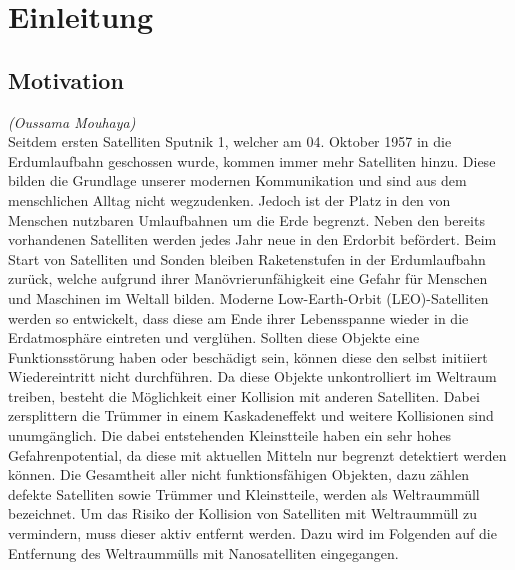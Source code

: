 \chapter{Einleitung}
		\section{Motivation}
	\hfill\emph{(Oussama Mouhaya)}\\
Seitdem ersten Satelliten Sputnik \num{1}, welcher am 04. Oktober 1957 in die Erdumlaufbahn geschossen wurde, kommen immer mehr Satelliten hinzu. Diese bilden die Grundlage unserer modernen Kommunikation und sind aus dem menschlichen Alltag nicht wegzudenken. Jedoch ist der Platz in den von Menschen nutzbaren Umlaufbahnen um die Erde begrenzt. Neben den bereits vorhandenen Satelliten werden jedes Jahr neue in den Erdorbit befördert. Beim Start von Satelliten und Sonden bleiben Raketenstufen in der Erdumlaufbahn zurück, welche aufgrund ihrer Manövrierunfähigkeit eine Gefahr für Menschen und Maschinen im Weltall bilden. Moderne Low-Earth-Orbit (LEO)-Satelliten werden so entwickelt, dass diese am Ende ihrer Lebensspanne wieder in die Erdatmosphäre eintreten und verglühen. Sollten diese Objekte eine Funktionsstörung haben oder beschädigt sein, können diese den selbst initiiert Wiedereintritt nicht durchführen. Da diese Objekte unkontrolliert im Weltraum treiben, besteht die Möglichkeit einer Kollision mit anderen Satelliten. Dabei zersplittern die Trümmer in einem Kaskadeneffekt und weitere Kollisionen sind unumgänglich. Die dabei entstehenden Kleinstteile haben ein sehr hohes Gefahrenpotential, da diese mit aktuellen Mitteln nur begrenzt detektiert werden können. Die Gesamtheit aller nicht funktionsfähigen Objekten, dazu zählen defekte Satelliten sowie Trümmer und Kleinstteile, werden als Weltraummüll bezeichnet. Um das Risiko der Kollision von Satelliten mit Weltraummüll zu vermindern, muss dieser aktiv entfernt werden. Dazu wird im Folgenden auf die Entfernung des Weltraummülls mit Nanosatelliten eingegangen.

